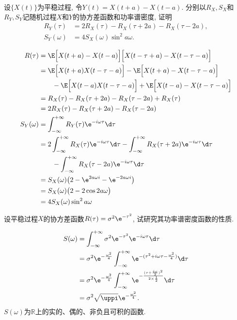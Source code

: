 \begin{problem}{4.20}
设$\{X(t)\}$为平稳过程, 令$Y(t) = X(t+a) - X(t-a)$. 分别以$R_X, S_X$和$R_Y, S_Y$记随机过程$X$和$Y$的协方差函数和功率谱密度, 证明
\[
	\begin{split}
		R_Y(\tau) & = 2R_X(\tau) - R_X(\tau + 2a) - R_X(\tau - 2a),\\
		S_Y(\omega) & = 4S_X(\omega)\sin^2a\omega.
	\end{split}
\]
\end{problem}
\begin{solution}
	\[
		\begin{split}
			R(\tau) & = \E\Big[X(t+a)-X(t-a)\Big]\Big[X(t-\tau+a)-X(t-\tau-a)\Big]\\
			& = \E\Big[X(t+a)X(t-\tau-a)\Big] - \E\Big[X(t+a)-X(t-\tau-a)\Big]\\
			& \qquad - \E\Big[X(t-a)X(t-\tau-a)\Big] + \E\Big[X(t-a)-X(t-\tau-a)\Big]\\
			& = R_X(\tau) - R_X(\tau+2a) - R_X(\tau-2a) + R_X(\tau)\\
			& = 2R_X(\tau) - R_X(\tau+2a) - R_X(\tau-2a)\\
			S_Y(\omega) & = \int^{+\infty}_{-\infty}R_Y(\tau)\e^{-i\omega\tau}\d \tau\\
			& = 2\int^{+\infty}_{-\infty}R_X(\tau)\e^{-i\omega\tau}\d \tau - \int^{+\infty}_{-\infty}R_X(\tau+2a)\e^{-i\omega\tau}\d \tau\\
			& \qquad - \int^{+\infty}_{-\infty}R_X(\tau-2a)\e^{-i\omega\tau}\d \tau\\
			& = S_X(\omega)\big(2 - \e^{2a\omega i} - \e^{-2a\omega i}\big)\\
			& = S_X(\omega)\big(2 - 2\cos 2a\omega\big)\\
			& = 4S_X(\omega)\sin^2a\omega
		\end{split}
	\]
\end{solution}

\begin{problem}{4.21}
设平稳过程$X$的协方差函数$R(\tau) = \sigma^2\e^{-\tau^2}$, 试研究其功率谱密度函数的性质.
\end{problem}
\begin{solution}
	\[
		\begin{split}
			S(\omega) & = \int^{+\infty}_{-\infty}\sigma^2\e^{-\tau^2}\e^{-i\omega\tau}\d \tau\\
			& = \sigma^2\e^{-\frac{\omega^2}{4}}\int^{+\infty}_{-\infty}\e^{-(\tau^2+i\omega\tau-\frac{\omega^2}{4})}\d \tau\\
			& = \sigma^2\e^{-\frac{\omega^2}{4}}\int^{+\infty}_{-\infty}\e^{-\frac{(\tau+\frac{i\omega}{2})^2}{2\times \frac{1}{2}}}\d \tau\\
			& = \sigma^2\sqrt{\uppi}\e^{-\frac{\omega^2}{4}}.
		\end{split}
	\]
	$S(\omega)$为$\mathbb{R}$上的实的、偶的、非负且可积的函数.
\end{solution}

